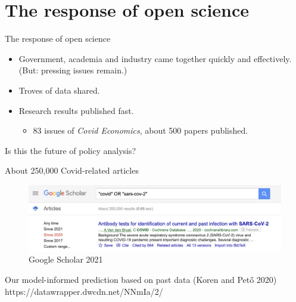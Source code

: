 \documentclass[
  ignorenonframetext,
  aspectratio=1610,
]{beamer}
\providecommand{\tightlist}{%
  \setlength{\itemsep}{0pt}\setlength{\parskip}{0pt}}
\begin{document}
\hypertarget{the-response-of-open-science}{%
\section{The response of open
science}\label{the-response-of-open-science}}

\begin{frame}{The response of open science}
\protect\hypertarget{the-response-of-open-science-1}{}
\begin{itemize}
\tightlist
\item
  Government, academia and industry came together quickly and
  effectively. (But: pressing issues remain.)
\item
  Troves of data shared.
\item
  Research results published fast.

  \begin{itemize}
  \tightlist
  \item
    83 issues of \emph{Covid Economics}, about 500 papers published.
  \end{itemize}
\end{itemize}

\begin{block}{Is this the future of policy analysis?}
\protect\hypertarget{is-this-the-future-of-policy-analysis}{}
\end{block}
\end{frame}

\begin{frame}{About 250,000 Covid-related articles}
\protect\hypertarget{about-250000-covid-related-articles}{}
\begin{figure}
\centering
\includegraphics{exhibit/fig/google-scholar.png}
\caption{Google Scholar 2021}
\end{figure}
\end{frame}

\begin{frame}{Our model-informed prediction based on past data (Koren
and Pető 2020)}
\protect\hypertarget{our-model-informed-prediction-based-on-past-data-koren-and-petux151-2020}{}
https://datawrapper.dwcdn.net/NNmIa/2/
\end{frame}
\end{document}
